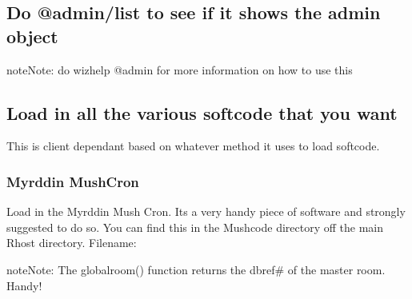 \documentclass[letterpaper,10pt,english]{sphinxmanual}
\begin{document}
\subsection{Do @admin/list to see if it shows the admin object}
\label{\detokenize{gettingstarted:do-admin-list-to-see-if-it-shows-the-admin-object}}
\begin{sphinxadmonition}{note}{Note:}
\sphinxAtStartPar
do wizhelp @admin for more information on how to use this
\end{sphinxadmonition}

\begin{sphinxVerbatim}[commandchars=\\\{\}]
\end{sphinxVerbatim}


\subsection{Load in all the various softcode that you want}
\label{\detokenize{gettingstarted:load-in-all-the-various-softcode-that-you-want}}
\sphinxAtStartPar
This is client dependant based on whatever method it uses to load softcode.


\subsubsection{Myrddin MushCron}
\label{\detokenize{gettingstarted:myrddin-mushcron}}
\sphinxAtStartPar
Load in the Myrddin Mush Cron.
It\textquotesingle{}s a very handy piece of software and strongly suggested to do so.  You can find this in the \textquotesingle{}Mushcode\textquotesingle{} directory off the main Rhost directory.
Filename:

\begin{sphinxVerbatim}[commandchars=\\\{\}]
\end{sphinxVerbatim}

\begin{sphinxadmonition}{note}{Note:}
\sphinxAtStartPar
The globalroom() function returns the dbref\# of the master room.  Handy!
\end{sphinxadmonition}

\begin{sphinxVerbatim}[commandchars=\\\{\}]
           
 
 
\end{sphinxVerbatim}
\end{document}
